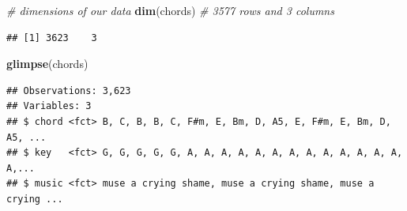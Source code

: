 \documentclass[]{article}
\newenvironment{Shaded}{\begin{snugshade}}{\end{snugshade}}
\newcommand{\CommentTok}[1]{\textcolor[rgb]{0.56,0.35,0.01}{\textit{#1}}}
\newcommand{\KeywordTok}[1]{\textcolor[rgb]{0.13,0.29,0.53}{\textbf{#1}}}
\newcommand{\NormalTok}[1]{#1}
\newcommand{\OperatorTok}[1]{\textcolor[rgb]{0.81,0.36,0.00}{\textbf{#1}}}
\newcommand{\StringTok}[1]{\textcolor[rgb]{0.31,0.60,0.02}{#1}}
\begin{document}
\begin{Shaded}
\end{Shaded}

\begin{Shaded}
\begin{Highlighting}[]
\CommentTok{# dimensions of our data }
\KeywordTok{dim}\NormalTok{(chords) }\CommentTok{# 3577 rows and 3 columns}
\end{Highlighting}
\end{Shaded}

\begin{verbatim}
## [1] 3623    3
\end{verbatim}

\begin{Shaded}
\begin{Highlighting}[]
\KeywordTok{glimpse}\NormalTok{(chords)}
\end{Highlighting}
\end{Shaded}

\begin{verbatim}
## Observations: 3,623
## Variables: 3
## $ chord <fct> B, C, B, B, C, F#m, E, Bm, D, A5, E, F#m, E, Bm, D, A5, ...
## $ key   <fct> G, G, G, G, G, A, A, A, A, A, A, A, A, A, A, A, A, A, A,...
## $ music <fct> muse a crying shame, muse a crying shame, muse a crying ...
\end{verbatim}
\end{document}
